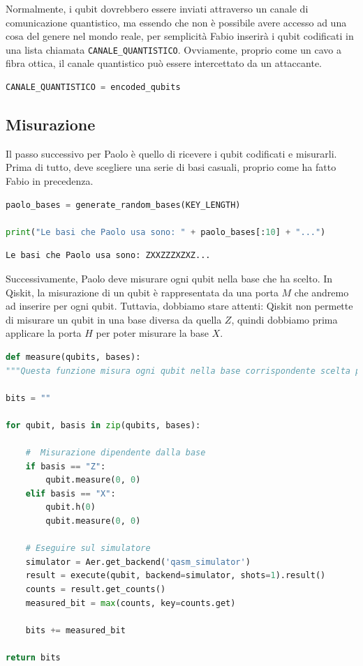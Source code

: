 \documentclass[a4paper]{article}
\begin{document}
Normalmente, i qubit dovrebbero essere inviati attraverso un canale di comunicazione
quantistico, ma essendo che non è possibile avere accesso ad una cosa del genere nel mondo reale,
per semplicità Fabio inserirà i qubit codificati in una lista chiamata \texttt{CANALE\_QUANTISTICO}.
Ovviamente, proprio come un cavo a fibra ottica, il canale quantistico può essere intercettato
da un attaccante.
\begin{lstlisting}[language=Python]
CANALE_QUANTISTICO = encoded_qubits 
\end{lstlisting}

\subsection{Misurazione}

Il passo successivo per Paolo è quello di ricevere i qubit codificati e misurarli.
Prima di tutto, deve scegliere una serie di basi casuali, proprio come ha fatto Fabio in precedenza.
\begin{lstlisting}[language=Python]
paolo_bases = generate_random_bases(KEY_LENGTH)

print("Le basi che Paolo usa sono: " + paolo_bases[:10] + "...")
\end{lstlisting}
\begin{lstlisting}
Le basi che Paolo usa sono: ZXXZZZXZXZ...
\end{lstlisting}
Successivamente, Paolo deve misurare ogni qubit nella base che ha scelto.
In Qiskit, la misurazione di un qubit è rappresentata da una porta \( M \) che
andremo ad inserire per ogni qubit. Tuttavia, dobbiamo stare attenti:
Qiskit non permette di misurare un qubit in una base diversa da quella \( Z \), quindi
dobbiamo prima applicare la porta \( H \) per poter misurare la base \( X \).
\begin{lstlisting}[language=Python]
def measure(qubits, bases):
"""Questa funzione misura ogni qubit nella base corrispondente scelta per esso."""

bits = "" 

for qubit, basis in zip(qubits, bases):

    #  Misurazione dipendente dalla base
    if basis == "Z":
        qubit.measure(0, 0)
    elif basis == "X":
        qubit.h(0)
        qubit.measure(0, 0)

    # Eseguire sul simulatore
    simulator = Aer.get_backend('qasm_simulator')
    result = execute(qubit, backend=simulator, shots=1).result()
    counts = result.get_counts()
    measured_bit = max(counts, key=counts.get) 

    bits += measured_bit
    
return bits
\end{lstlisting}
\end{document}
